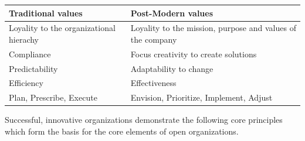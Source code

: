 \documentclass[]{book}
\begin{document}
\begin{longtable}[]{@{}ll@{}}
\toprule
\begin{minipage}[b]{0.47\columnwidth}\raggedright
Traditional values\strut
\end{minipage} & \begin{minipage}[b]{0.47\columnwidth}\raggedright
Post-Modern values\strut
\end{minipage}\tabularnewline
\midrule
\endhead
\begin{minipage}[t]{0.47\columnwidth}\raggedright
Loyality to the organizational hierachy\strut
\end{minipage} & \begin{minipage}[t]{0.47\columnwidth}\raggedright
Loyality to the mission, purpose and values of the company\strut
\end{minipage}\tabularnewline
\begin{minipage}[t]{0.47\columnwidth}\raggedright
Compliance\strut
\end{minipage} & \begin{minipage}[t]{0.47\columnwidth}\raggedright
Focus creativity to create solutions\strut
\end{minipage}\tabularnewline
\begin{minipage}[t]{0.47\columnwidth}\raggedright
Predictability\strut
\end{minipage} & \begin{minipage}[t]{0.47\columnwidth}\raggedright
Adaptability to change\strut
\end{minipage}\tabularnewline
\begin{minipage}[t]{0.47\columnwidth}\raggedright
Efficiency\strut
\end{minipage} & \begin{minipage}[t]{0.47\columnwidth}\raggedright
Effectiveness\strut
\end{minipage}\tabularnewline
\begin{minipage}[t]{0.47\columnwidth}\raggedright
Plan, Prescribe, Execute\strut
\end{minipage} & \begin{minipage}[t]{0.47\columnwidth}\raggedright
Envision, Prioritize, Implement, Adjust\strut
\end{minipage}\tabularnewline
\bottomrule
\end{longtable}

Successful, innovative organizations demonstrate the following core principles which form the basis for the core elements of open organizations. \citep{Whitehurst2019}
\end{document}
